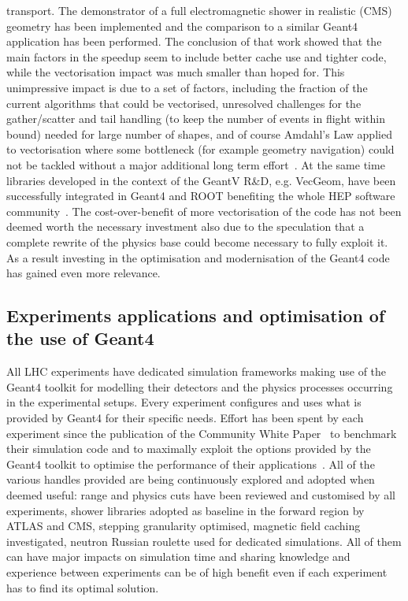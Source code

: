 \documentclass[11pt,a4paper]{article}
\begin{document}
transport. The demonstrator of a full electromagnetic shower in
realistic (CMS) geometry has been implemented and the comparison to a
similar Geant4 application has been performed. The conclusion of that
work showed that the main factors in the speedup seem to include better
cache use and tighter code, while the vectorisation impact was much
smaller than hoped for. This unimpressive impact is due to a set of
factors, including the fraction of the current algorithms that could be
vectorised, unresolved challenges for the gather/scatter and tail
handling (to keep the number of events in flight within bound) needed
for large number of shapes, and of course Amdahl's Law applied to
vectorisation where some bottleneck (for example geometry navigation)
could not be tackled without a major additional long term effort~\cite{GeantV}.
At the same time libraries developed in the context of the
GeantV R\&D, e.g. VecGeom, have been successfully integrated in Geant4
and ROOT benefiting the whole HEP software community~\cite{CMS01}. The
cost-over-benefit of more vectorisation of the code has not been deemed
worth the necessary investment also due to the speculation that a
complete rewrite of the physics base could become necessary to fully
exploit it. As a result investing in the optimisation and modernisation
of the Geant4 code has gained even more relevance.

\hypertarget{experiments-applications-and-optimisation-of-the-use-of-geant4}{%
\subsection{Experiments applications and optimisation of the use of
Geant4}\label{experiments-applications-and-optimisation-of-the-use-of-geant4}}

All LHC experiments have dedicated simulation frameworks making use of
the Geant4 toolkit for modelling their detectors and the physics
processes occurring in the experimental setups. Every experiment
configures and uses what is provided by Geant4 for their specific needs.
Effort has been spent by each experiment since the publication of the
Community White Paper~\cite{Albrecht2019, SimFoundation2018hep} to benchmark their 
simulation code and to maximally
exploit the options provided by the Geant4 toolkit to optimise the
performance of their applications~\cite{ATLAS-G4OPT}. All of the various handles provided
are being continuously explored and adopted when deemed useful: range
and physics cuts have been reviewed and customised by all experiments,
shower libraries adopted as baseline in the forward region by ATLAS and
CMS, stepping granularity optimised, magnetic field caching
investigated, neutron Russian roulette used for dedicated simulations.
All of them can have major impacts on simulation time and sharing
knowledge and experience between experiments can be of high benefit even
if each experiment has to find its optimal solution.
\end{document}
